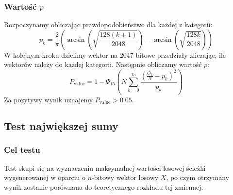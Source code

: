 \subsubsection{Wartość $p$}
Rozpoczynamy obliczając prawdopodobieństwo dla każdej z kategorii:
\begin{equation}
    p_k = \frac{2}{\pi}\left(\arcsin\left(\sqrt{\frac{128(k+1)}{2048}}\right) - \arcsin\left(\sqrt{\frac{128k}{2048}}\right)\right)
\end{equation}
W kolejnym kroku dzielimy wektor na 2047-bitowe przedziały zliczając, ile wektorów należy do każdej kategorii. Następnie obliczamy wartość $p$:
\begin{equation}
    P_{\textrm{value}} =  1 - \Psi_{15}\left(N\sum_{k=0}^{15}{\frac{(\frac{O_k}{N}-p_k)^2}{p_k}}\right)
\end{equation}
Za pozytywy wynik uznajemy $P_{\textrm{value}} > 0.05$.
\subsection{Test największej sumy}
\subsubsection{Cel testu}
Test skupi się na wyznaczeniu maksymalnej wartości losowej ścieżki wygenerowanej w oparciu o $n$-bitowy wektor losowy $X$, po czym otrzymany wynik zostanie porównana do teoretycznego rozkładu tej zmiennej.
